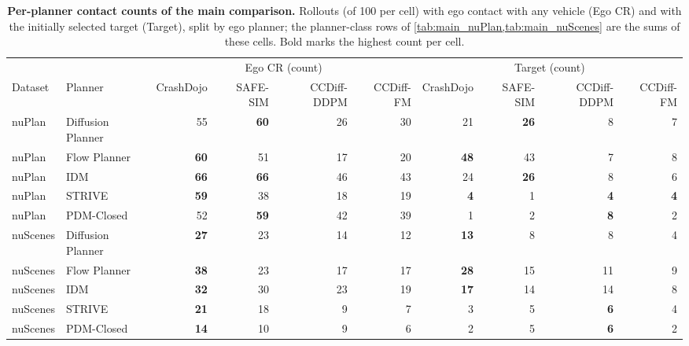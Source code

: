 \begin{table}[t]
\centering
\caption{\textbf{Per-planner contact counts of the main comparison.} Rollouts (of 100 per cell) with ego contact with any vehicle (Ego CR) and with the initially selected target (Target), split by ego planner; the planner-class rows of \cref{tab:main_nuPlan,tab:main_nuScenes} are the sums of these cells. Bold marks the highest count per cell.}
\label{tab:per_planner_contact}
\begingroup\footnotesize\setlength{\tabcolsep}{4pt}\renewcommand{\arraystretch}{1.12}
\begin{tabular}{@{}llrrrrrrrr@{}}
\toprule
 & & \multicolumn{4}{c}{Ego CR (count)} & \multicolumn{4}{c}{Target (count)}\\
\cmidrule(lr){3-6}\cmidrule(l){7-10}
Dataset & Planner & CrashDojo & SAFE-SIM & CCDiff-DDPM & CCDiff-FM & CrashDojo & SAFE-SIM & CCDiff-DDPM & CCDiff-FM\\
\midrule
nuPlan & Diffusion Planner & 55 & \textbf{60} & 26 & 30 & 21 & \textbf{26} & 8 & 7\\
nuPlan & Flow Planner & \textbf{60} & 51 & 17 & 20 & \textbf{48} & 43 & 7 & 8\\
nuPlan & IDM & \textbf{66} & \textbf{66} & 46 & 43 & 24 & \textbf{26} & 8 & 6\\
nuPlan & STRIVE & \textbf{59} & 38 & 18 & 19 & \textbf{4} & 1 & \textbf{4} & \textbf{4}\\
nuPlan & PDM-Closed & 52 & \textbf{59} & 42 & 39 & 1 & 2 & \textbf{8} & 2\\
\midrule
nuScenes & Diffusion Planner & \textbf{27} & 23 & 14 & 12 & \textbf{13} & 8 & 8 & 4\\
nuScenes & Flow Planner & \textbf{38} & 23 & 17 & 17 & \textbf{28} & 15 & 11 & 9\\
nuScenes & IDM & \textbf{32} & 30 & 23 & 19 & \textbf{17} & 14 & 14 & 8\\
nuScenes & STRIVE & \textbf{21} & 18 & 9 & 7 & 3 & 5 & \textbf{6} & 4\\
nuScenes & PDM-Closed & \textbf{14} & 10 & 9 & 6 & 2 & 5 & \textbf{6} & 2\\
\bottomrule
\end{tabular}\endgroup
\end{table}
